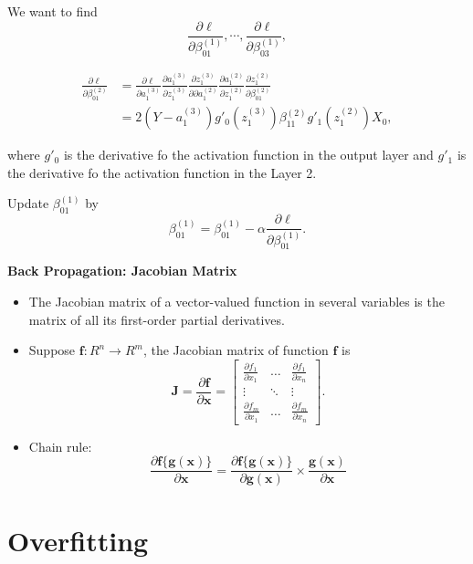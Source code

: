 \documentclass[]{book}
\begin{document}
We want to find \[
\frac{\partial \ell}{\partial \beta_{01}^{(1)}}, \cdots, \frac{\partial \ell}{\partial \beta_{03}^{(1)}},
\]

\begin{align*}
\frac{\partial \ell}{\partial \beta_{01}^{(2)}} & = \frac{\partial \ell}{\partial a_1^{(3)}}
\frac{\partial a_1^{(3)}}{\partial z_1^{(3)}} \frac{\partial z_1^{(3)}}{\partial \partial a_1^{(2)}} \frac{\partial a_1^{(2)}}{\partial z_1^{(2)}} \frac{\partial z_1^{(2)}}{\partial \beta_{01}^{(2)}}\\
& = 2(Y-a_1^{(3)})g'_0(z_1^{(3)}) \beta^{(2)}_{11} g'_1(z_1^{(2)}) X_0,
\end{align*}

where \(g'_0\) is the derivative fo the activation function in the
output layer and \(g'_1\) is the derivative fo the activation function
in the Layer 2.

Update \(\beta_{01}^{(1)}\) by \[
\beta_{01}^{(1)} = \beta_{01}^{(1)} - \alpha \frac{\partial \ell}{\partial \beta_{01}^{(1)}}.
\]

\textbf{Back Propagation: Jacobian Matrix}

\begin{itemize}
\item
  The Jacobian matrix of a vector-valued function in several variables
  is the matrix of all its first-order partial derivatives.
\item
  Suppose \(\boldsymbol{f}: R^{n} \to R^{m}\), the Jacobian matrix of
  function \(\boldsymbol{f}\) is \[
  \boldsymbol{J} = \frac{\partial \boldsymbol{f}}{\partial \boldsymbol{x}}
   = \begin{bmatrix}
  \frac{\partial f_1}{\partial x_1}  & \ldots  &  \frac{\partial f_1}{\partial x_n} \\
  \vdots  & \ddots & \vdots \\
  \frac{\partial f_m}{\partial x_1}  & \ldots  &  \frac{\partial f_m}{\partial x_n} 
  \end{bmatrix}.
  \]
\item
  Chain rule: \[
  \frac{\partial \boldsymbol{f}\{{\boldsymbol{g}(\boldsymbol{x})\}}}{\partial \boldsymbol{x}} = \frac{\partial \boldsymbol{f}\{{\boldsymbol{g}(\boldsymbol{x})\}}}{\partial \boldsymbol{g}(\boldsymbol{x})}  \times 
  \frac{\boldsymbol{g}(\boldsymbol{x}) }{\partial \boldsymbol{x}} 
  \]
\end{itemize}

\section{Overfitting}\label{overfitting}
\end{document}
